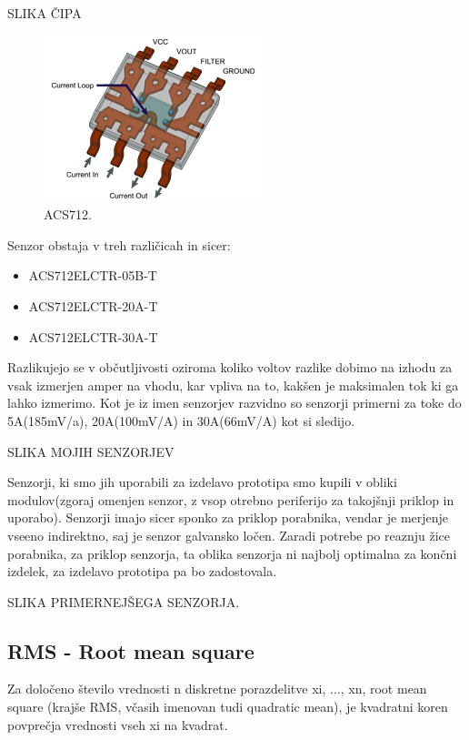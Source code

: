 \documentclass[12pt,a4paper,titlepage,openany]{report}
\begin{document}
SLIKA ČIPA

\begin{figure}[H]
\begin{center}
\includegraphics[width=0.5\linewidth]{Slike/ACS712.jpg}
\end{center}
\caption{ACS712.}\label{slika:ACS712}
\end{figure}

Senzor obstaja v treh različicah in sicer:

\begin{itemize}
\item ACS712ELCTR-05B-T
\item ACS712ELCTR-20A-T
\item ACS712ELCTR-30A-T
\end{itemize}

Razlikujejo se v občutljivosti oziroma koliko voltov razlike dobimo na izhodu za vsak izmerjen amper na vhodu, kar vpliva na to, kakšen je maksimalen tok ki ga lahko izmerimo. Kot je iz imen senzorjev razvidno so senzorji primerni za toke do 5A(185mV/a), 20A(100mV/A) in 30A(66mV/A) kot si sledijo.


SLIKA MOJIH SENZORJEV

Senzorji, ki smo jih uporabili za izdelavo prototipa smo kupili v obliki modulov(zgoraj omenjen senzor, z vsop otrebno periferijo za takojšnji priklop in uporabo). Senzorji imajo sicer sponko za priklop porabnika, vendar je merjenje vseeno indirektno, saj je senzor galvansko ločen. Zaradi potrebe po reaznju žice porabnika, za priklop senzorja, ta oblika senzorja ni najbolj optimalna za končni izdelek, za izdelavo prototipa pa bo zadostovala.

SLIKA PRIMERNEJŠEGA SENZORJA.

\subsection{RMS - Root mean square}

Za določeno število vrednosti n diskretne porazdelitve xi, ..., xn, root mean square (krajše RMS, včasih imenovan tudi
quadratic mean), je kvadratni koren povprečja vrednosti vseh xi na kvadrat.
\end{document}
